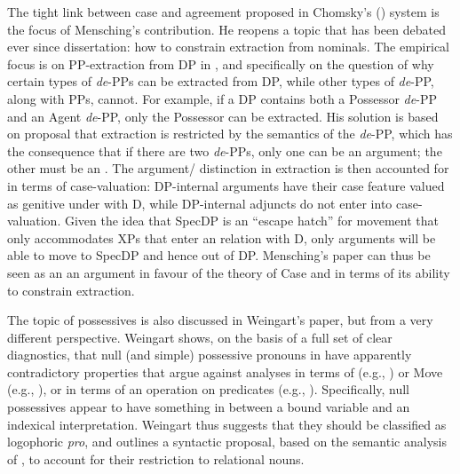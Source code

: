 \documentclass[output=paper]{langsci/langscibook}
\begin{document}
The tight link between case and agreement proposed in Chomsky’s (\citeyear{Chomsky2000,Chomsky2001Derivation})  system is the focus of Mensching’s contribution. He reopens a topic that has been debated ever since  dissertation: how to constrain extraction from nominals. The empirical focus is on PP-extraction from DP in , and specifically on the question of why certain types of \textit{de}{}-PPs can be extracted from DP, while other types of \textit{de}{}-PP, along with  PPs, cannot. For example, if a DP contains both a Possessor \textit{de}{}-PP and an Agent \textit{de}{}-PP, only the Possessor can be extracted. His solution is based on  proposal that extraction is restricted by the semantics of the \textit{de}{}-PP, which has the consequence that if there are two \textit{de}{}-PPs, only one can be an argument; the other must be an . The argument\slash {} distinction in extraction is then accounted for in terms of case-valuation: DP-internal arguments have their case feature valued as genitive under  with D, while DP-internal adjuncts do not enter into case-valuation. Given the idea that SpecDP is an ``escape hatch'' for movement that only accommodates XPs that enter an  relation with D, only arguments will be able to move to SpecDP and hence out of DP. Mensching’s paper can thus be seen as an an argument in favour of the  theory of Case and  in terms of its ability to constrain extraction.

The topic of possessives is also discussed in Weingart’s paper, but from a very different perspective. Weingart shows, on the basis of a full set of clear diagnostics, that null (and simple) possessive pronouns in  have apparently contradictory properties that argue against analyses in terms of  (e.g., \citealt{Hicks2009}) or Move (e.g., \citealt{Floripi2009,Rodrigues2010}), or in terms of an operation on predicates (e.g., \citealt{Reinhart2006}). Specifically, null possessives appear to have something in between a bound variable and an indexical interpretation. Weingart thus suggests that they should be classified as logophoric \textit{pro}, and outlines a syntactic proposal, based on the semantic analysis of \citet{Partee1997}, to account for their restriction to relational nouns.
\end{document}
